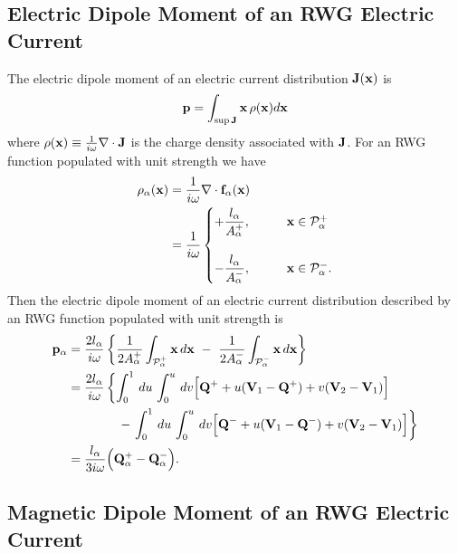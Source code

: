 \documentclass[letterpaper]{article}
\begin{document}
\subsection{Electric Dipole Moment of an RWG Electric Current}
The electric dipole moment of an electric current distribution $\mathbf{J}(\mathbf{x})$ is 
$$\mathbf{p}= \int_{\sup \mathbf{J}}  \mathbf{x}\, \rho(\mathbf{x}) d\mathbf{x} $$
where $\rho(\mathbf{x})\equiv \frac{1}{i\omega}\nabla \cdot \mathbf{J}$ is the charge 
density associated with $\mathbf{J}$. For an RWG function populated with unit 
strength we have 
\begin{align} 
 \rho_\alpha(\mathbf{x}) 
 &=\frac{1}{i\omega}\nabla \cdot \mathbf{f}_\alpha(\mathbf{x}) \nonumber \\
 &=\frac{1}{i\omega}
   \begin{cases} 
    +\displaystyle{\frac{l_\alpha}{A^+_\alpha}}, 
     \qquad &\mathbf{x} \in \mathcal{P}_\alpha^+ \\\\
    -\displaystyle{\frac{l_\alpha}{A^-_\alpha}}, 
      \qquad &\mathbf{x} \in \mathcal{P}_\alpha^-.
   \end{cases} \label{rhoRWG}
\end{align} 
Then the electric dipole moment of an electric current distribution 
described by an RWG function populated with unit strength is 
\begin{align*}
  \mathbf{p}_\alpha 
&= \frac{2l_\alpha}{i\omega}
   \left\{ 
   \frac{1}{2A^+_\alpha} \int_{\mathcal{P}_\alpha^+} \mathbf{x} \,d\mathbf{x}  
   \,\,- \,\,
   \frac{1}{2A^-_\alpha} \int_{\mathcal{P}_\alpha^-} \mathbf{x} \, d\mathbf{x} 
   \right\}  \\
&= \frac{2l_\alpha}{i\omega}
   \left\{ 
            \int_0^1 \,du\,\int_0^u \, dv 
            \Big[ \mathbf{Q}^+ + u(\mathbf{V}_1-\mathbf{Q}^+) + v(\mathbf{V}_2 - \mathbf{V}_1)  \Big]
   \right. \\
&  \qquad \qquad- 
   \left. 
            \int_0^1 \,du\,\int_0^u \, dv 
            \Big[ \mathbf{Q}^- + u(\mathbf{V}_1-\mathbf{Q}^-) + v(\mathbf{V}_2 - \mathbf{V}_1)  \Big]
   \right\} \\
&= \frac{l_\alpha}{3 i\omega}\Big(\mathbf{Q}^+_\alpha - \mathbf{Q}^-_\alpha\Big).
\end{align*}

\subsection{Magnetic Dipole Moment of an RWG Electric Current}
\end{document}
